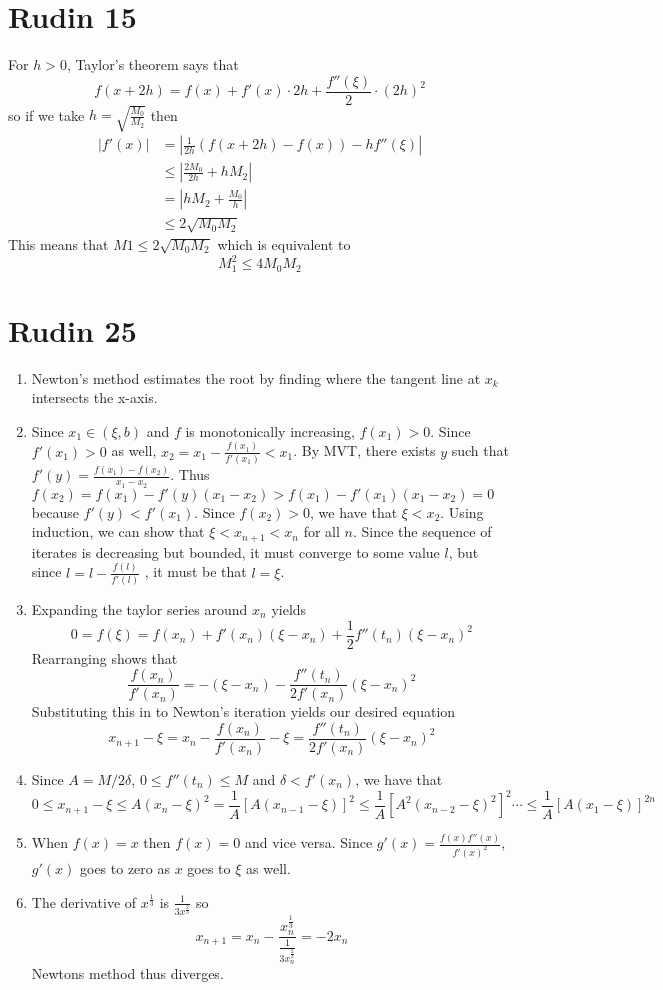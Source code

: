 \documentclass{article}
\begin{document}
\section*{Rudin 15}
For $h>0$, Taylor's theorem says that 
\[
	f(x+2h) = f(x) + f'(x)\cdot 2h + \frac{f''(\xi)}{2}\cdot (2h)^2
\]
so if we take $h = \sqrt{\frac{M_0}{M_2}}$ then
\begin{align*}
	|f'(x)| &= \left|\frac{1}{2h}(f(x+2h)-f(x)) - hf''(\xi)\right| \\
	&\leq |\frac{2M_0}{2h} + hM_2| \\
	&= |hM_2 + \frac{M_0}{h}| \\
	&\leq 2\sqrt{M_0M_2}
\end{align*}
This means that  $M1 \leq 2\sqrt{M_0M_2}$ which is equivalent to
\[
	M_1^2 \leq 4M_0M_2
\]



\newpage

\section*{Rudin 25}
\begin{enumerate}
	\item Newton's method estimates the root by finding where the 
	tangent line at $x_k$ intersects the x-axis.
	\item Since $x_1 \in (\xi, b)$ and $f$ is monotonically increasing,
	$f(x_1) > 0$. Since $f'(x_1) > 0$ as well, $x_2 = x_1 - \frac{f(x_1)}{f'(x_1)} < x_1$.
	By MVT, there exists $y$ such that $f'(y) = \frac{f(x_1) - f(x_2)}{x_1 - x_2}$.
	Thus $f(x_2) = f(x_1)-f'(y)(x_1 - x_2) > f(x_1)-f'(x_1)(x_1 - x_2) = 0$
	because $f'(y) < f'(x_1)$. Since $f(x_2) > 0$, we have that $\xi < x_2$.
	Using induction, we can show that $\xi < x_{n+1} < x_n$ for all $n$.
	Since the sequence of iterates is decreasing but bounded, it must converge to some
	value $l$, but since $l = l - \frac{f(l)}{f'(l)}$ , it must be that $l = \xi$.
	\item Expanding the taylor series around $x_n$ yields 
	\[	
		0 = f(\xi) = f(x_n) + f'(x_n)(\xi - x_n) + \frac{1}{2}f''(t_n)(\xi - x_n)^2
	\]
	Rearranging shows that 
	\[
		\frac{f(x_n)}{f'(x_n)} = -(\xi - x_n) - \frac{f''(t_n)}{2f'(x_n)}(\xi - x_n)^2
	\]
	Substituting this in to Newton's iteration yields our desired equation
	\[
		x_{n+1} - \xi = x_n - \frac{f(x_n)}{f'(x_n)} - \xi= \frac{f''(t_n)}{2f'(x_n)}(\xi - x_n)^2
	\]
	\item  Since $A = M/2\delta$, $0 \leq f''(t_n) \leq M$ and $\delta < f'(x_n)$, we have that
	\[	
		0 \leq x_{n+1} - \xi \leq A(x_n-\xi)^2 = \frac{1}{A}[A(x_{n-1}-\xi)]^2 \leq \frac{1}{A}[A^2(x_{n-2}-\xi)^2]^2 \cdots \leq \frac{1}{A}[A(x_{1}-\xi)]^{2n}
	\]
	\item When $f(x) = x$ then $f(x) = 0$ and vice versa.
	Since $g'(x) = \frac{f(x)f''(x)}{f'(x)^2}$, $g'(x)$ goes to zero as $x$ goes to $\xi$ as well.
	\item The derivative of $x^\frac{1}{3}$ is $\frac{1}{3x^\frac{2}{3}}$ so 
	\[	
		x_{n+1} = x_n - \frac{x_n^\frac{1}{3}}{\frac{1}{3x_n^\frac{2}{3}}} =  -2x_n
	\]
	Newtons method thus diverges.

\end{enumerate}
\newpage
\end{document}
